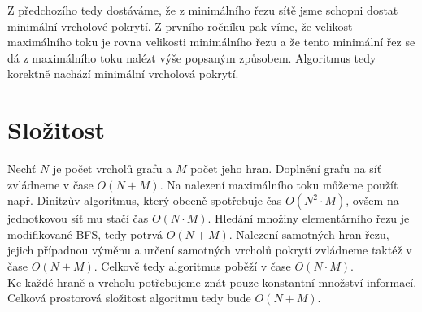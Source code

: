 \documentclass{scrartcl}
\begin{document}
Z předchozího tedy dostáváme, že z minimálního řezu sítě jsme schopni dostat minimální vrcholové pokrytí. Z prvního ročníku pak víme, že velikost maximálního toku je rovna velikosti minimálního řezu a že tento minimální řez se dá z maximálního toku nalézt výše popsaným způsobem. Algoritmus tedy korektně nachází minimální vrcholová pokrytí.

\section{Složitost}
Nechť $N$ je počet vrcholů grafu a $M$ počet jeho hran. Doplnění grafu na síť zvládneme v čase $O(N + M)$. Na nalezení maximálního toku můžeme použít např. Dinitzův algoritmus, který obecně spotřebuje čas $O(N^2 \cdot M)$, ovšem na jednotkovou síť mu stačí čas $O(N \cdot M)$. Hledání množiny elementárního řezu je modifikované BFS, tedy potrvá $O(N + M)$. Nalezení samotných hran řezu, jejich případnou výměnu a určení samotných vrcholů pokrytí zvládneme taktéž v čase $O(N + M)$. Celkově tedy algoritmus poběží v čase $O(N \cdot M)$. \\

Ke každé hraně a vrcholu potřebujeme znát pouze konstantní množství informací. Celková prostorová složitost algoritmu tedy bude $O(N + M)$.
\end{document}
